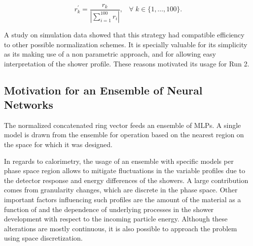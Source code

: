 \begin{equation}
  r^\prime_{k} = \frac{r_{k}}{| \sum\limits_{i=1}^{100} r_i
  |}, \;\;\;
    \forall \; k\in\{1,\dots,100\}.
\label{eq:ring_norm}
\end{equation}

A study on simulation data showed that this strategy had compatible
efficiency to other possible normalization schemes. It is specially valuable for its
simplicity as its making use of a non parametric approach, and for allowing easy interpretation of the shower profile. These reasons motivated its usage for Run 2.

\subsection{Motivation for an Ensemble of Neural Networks}\label{top:nn_ensemble}

The normalized concatenated ring vector feeds an ensemble of MLPs. A single
model is drawn from the ensemble for operation based on the nearest region on the \eteta space for which it was designed.

In regards to calorimetry, the usage of an ensemble with specific models per
phase space region allows to mitigate fluctuations in the variable profiles
due to the detector response and energy differences of the showers.
A large contribution comes from granularity changes, which are discrete
in the phase space. Other important factors 
influencing such profiles are the
amount of the material as a function of \abseta{} and the dependence of
underlying processes in the shower development with respect to the incoming
particle energy. Although these alterations are mostly continuous, it is also
possible to approach the problem using space discretization.


